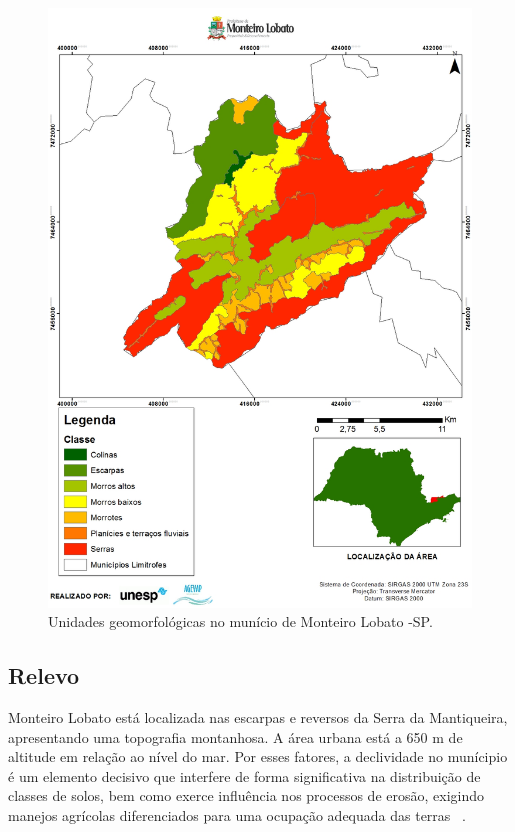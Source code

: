  \begin{figure}[h!]
 	\centering
 	\includegraphics[width=0.85\linewidth]{produtos/proddois/image019}
 	\caption{Unidades geomorfológicas no munício de Monteiro Lobato -SP.}
 	\label{fig:image019}
 \end{figure}
\clearpage
\subsection{Relevo}

Monteiro Lobato está localizada nas escarpas e reversos da Serra da Mantiqueira, apresentando uma topografia montanhosa. A área urbana está a 650 m de altitude em relação ao nível do mar. Por esses fatores, a declividade no munícipio é um elemento decisivo que interfere de forma significativa na distribuição de classes de solos, bem como exerce influência nos processos de erosão, exigindo manejos agrícolas diferenciados para uma ocupação adequada das terras ~\cite{MonteiroLobato2014}.

